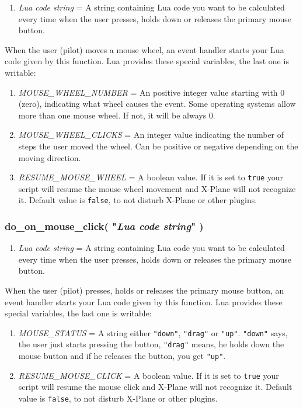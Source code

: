 \documentclass[11pt,parskip=half,a4paper]{scrartcl}
\begin{document}
\begin{enumerate}
	\item \emph{Lua code string} = A string containing Lua code you want to be calculated every time when the user presses, holds down or releases the primary mouse button.
\end{enumerate}

When the user (pilot) moves a mouse wheel, an event handler starts your Lua code given by this function. Lua provides these special variables, the last one is writable:

\begin{enumerate}
	\item \emph{MOUSE\_WHEEL\_NUMBER} = An positive integer value starting with 0 (zero), indicating what wheel causes the event. Some operating systems allow more than one mouse wheel. If not, it will be always 0.
	\item \emph{MOUSE\_WHEEL\_CLICKS} = An integer value indicating the number of steps the user moved the wheel. Can be positive or negative depending on the moving direction.
	\item \emph{RESUME\_MOUSE\_WHEEL} = A boolean value. If it is set to \verb|true| your script will resume the mouse wheel movement and X-Plane will not recognize it. Default value is \verb|false|, to not disturb X-Plane or other plugins.
\end{enumerate}


\subsubsection{do\_on\_mouse\_click( "\emph{Lua code string}" )}

\begin{enumerate}
	\item \emph{Lua code string} = A string containing Lua code you want to be calculated every time when the user presses, holds down or releases the primary mouse button.
\end{enumerate}

When the user (pilot) presses, holds or releases the primary mouse button, an event handler starts your Lua code given by this function. Lua provides these special variables, the last one is writable:

\begin{enumerate}
	\item \emph{MOUSE\_STATUS} = A string either \verb|"down"|, \verb|"drag"| or \verb|"up"|. \verb|"down"| says, the user just starts pressing the button, \verb|"drag"| means, he holds down the mouse button and if he releases the button, you get \verb|"up"|.
	\item \emph{RESUME\_MOUSE\_CLICK} = A boolean value. If it is set to \verb|true| your script will resume the mouse click and X-Plane will not recognize it. Default value is \verb|false|, to not disturb X-Plane or other plugins.
\end{enumerate}
\end{document}
